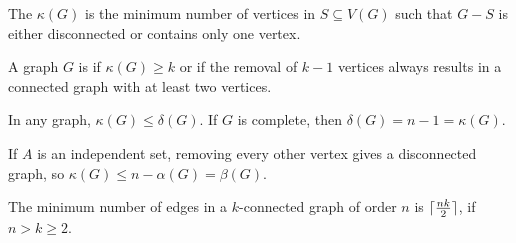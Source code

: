 
\begin{definition}
  The  $\kappa(G)$ is the minimum number of vertices
  in $S \subseteq V(G)$ such that $G - S$ is either disconnected or contains
  only one vertex.
\end{definition}

\begin{definition}
  A graph $G$ is  if $\kappa(G) \ge k$ or if the removal of
  $k-1$ vertices always results in a connected graph with at least two vertices.
\end{definition}

\begin{remark}
  In any graph, $\kappa(G) \le \delta(G)$.
  If $G$ is complete, then $\delta(G) = n-1 = \kappa(G)$.
\end{remark}

\begin{remark}
  If $A$ is an independent set, removing every other vertex gives a disconnected
  graph, so $\kappa(G) \le n-\alpha(G) = \beta(G)$.
\end{remark}


\begin{theorem}
  The minimum number of edges in a $k$-connected graph of order $n$ is
  $\lceil \frac{nk}{2} \rceil$, if $n > k \ge 2$.
\end{theorem}

